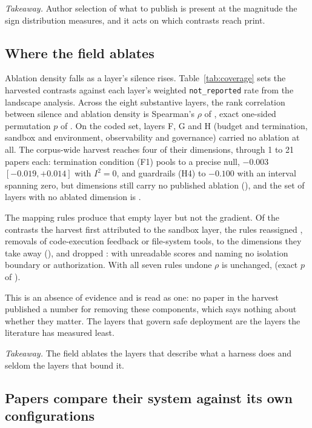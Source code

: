 \emph{Takeaway.} Author selection of what to publish is present at the magnitude the sign distribution
measures, and it acts on which contrasts reach print.

\subsection{Where the field ablates}\label{subsec:coverage}

Ablation density falls as a layer's silence rises. Table~\ref{tab:coverage} sets the harvested contrasts
against each layer's weighted \texttt{not\_reported} rate from the landscape analysis. Across the eight
substantive layers, the rank correlation between
silence and ablation density is Spearman's $\rho$ of \rqCoverageRho, exact one-sided permutation $p$ of
\rqCoverageP. On the coded set, layers F, G and H (budget and termination, sandbox and environment,
observability and governance) carried no ablation at all. The corpus-wide harvest reaches four of their
dimensions, through 1 to 21 papers each: termination condition (F1) pools to a precise null,
$-0.003$ $[-0.019, +0.014]$ with $I^2 = 0$, and guardrails (H4) to $-0.100$ with an interval spanning
zero, but \rqZeroDimCount{} dimensions still carry no published ablation (\rqZeroDimList), and the set
of layers with no ablated dimension is \rqZeroLayerList{}.

The mapping rules produce that empty layer but not the gradient. Of the \rqPreRuleGContrasts{}
contrasts the harvest first attributed to the sandbox layer, the rules reassigned
\rqPreRuleGRemapped{}, removals of code-execution feedback or file-system tools, to the dimensions they
take away (\rqPreRuleGRemapList), and dropped \rqPreRuleGDropped{}: \rqPreRuleGDroppedUnread{} with
unreadable scores and \rqPreRuleGDroppedUnnamed{} naming no isolation boundary or authorization. With
all seven rules undone $\rho$ is unchanged, \rqPreRuleRho{} (exact $p$ of \rqPreRuleP).



This is an absence of evidence and is read as one: no paper in the harvest published a number for
removing these components, which says nothing about whether they matter. The layers that govern safe
deployment are the layers the literature has measured least.

\emph{Takeaway.} The field ablates the layers that describe what a harness does and seldom the layers
that bound it.

\subsection{Papers compare their system against its own configurations}\label{subsec:attribution}

